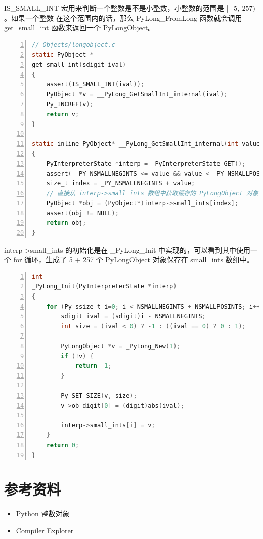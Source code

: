 IS\_SMALL\_INT 宏用来判断一个整数是不是小整数，小整数的范围是 $[-5,\ 257)$。如果一个整数
在这个范围内的话，那么 PyLong\_FromLong 函数就会调用 get\_small\_int 函数来返回一个 PyLongObject。

\begin{lstlisting}[language=C, numbers=left, numbersep=1em, numberstyle=\footnotesize , breaklines=true]
// Objects/longobject.c
static PyObject *
get_small_int(sdigit ival)
{
    assert(IS_SMALL_INT(ival));
    PyObject *v = __PyLong_GetSmallInt_internal(ival);
    Py_INCREF(v);
    return v;
}

static inline PyObject* __PyLong_GetSmallInt_internal(int value)
{
    PyInterpreterState *interp = _PyInterpreterState_GET();
    assert(-_PY_NSMALLNEGINTS <= value && value < _PY_NSMALLPOSINTS);
    size_t index = _PY_NSMALLNEGINTS + value;
    // 直接从 interp->small_ints 数组中获取缓存的 PyLongObject 对象
    PyObject *obj = (PyObject*)interp->small_ints[index];
    assert(obj != NULL);
    return obj;
}

\end{lstlisting}

interp->small\_ints 的初始化是在 \_PyLong\_Init 中实现的，可以看到其中使用一个 for 循环，生成了 5 + 257 个 PyLongObject
对象保存在 small\_ints 数组中。

\begin{lstlisting}[language=C, numbers=left, numbersep=1em, numberstyle=\footnotesize , breaklines=true]
int
_PyLong_Init(PyInterpreterState *interp)
{
    for (Py_ssize_t i=0; i < NSMALLNEGINTS + NSMALLPOSINTS; i++) {
        sdigit ival = (sdigit)i - NSMALLNEGINTS;
        int size = (ival < 0) ? -1 : ((ival == 0) ? 0 : 1);

        PyLongObject *v = _PyLong_New(1);
        if (!v) {
            return -1;
        }

        Py_SET_SIZE(v, size);
        v->ob_digit[0] = (digit)abs(ival);

        interp->small_ints[i] = v;
    }
    return 0;
}
\end{lstlisting}




\section{参考资料}

\begin{itemize}
\item \href{https://flaggo.github.io/python3-source-code-analysis/objects/long-object/}{Python 整数对象}
\item \href{https://godbolt.org/}{Compiler Explorer}
\end{itemize}

